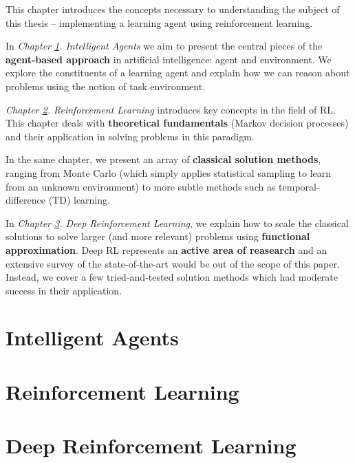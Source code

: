 This chapter introduces the concepts necessary to understanding the subject of this thesis -- implementing a learning agent using reinforcement learning.

In \emph{Chapter \ref{agents-intro}. Intelligent Agents} we aim to present the central pieces of the \textbf{agent-based approach} in artificial intelligence: agent and environment.
We explore the constituents of a learning agent and explain how we can reason about problems using the notion of task environment.

\emph{Chapter \ref{reinforcement-learning}. Reinforcement Learning} introduces key concepts in the field of RL. This chapter deals with \textbf{theoretical fundamentals} (Markov decision processes) and their application in solving problems in this paradigm.

In the same chapter, we present an array of \textbf{classical solution methods}, ranging from Monte Carlo (which simply applies statistical sampling to learn from an unknown environment) to more subtle methods such as temporal-difference (TD) learning.

In \emph{Chapter \ref{deep-rl}. Deep Reinforcement Learning}, we explain how to scale the classical solutions to solve larger (and more relevant) problems using \textbf{functional approximation}.
Deep RL represents an \textbf{active area of reasearch} and an extensive survey of the state-of-the-art would be out of the scope of this paper.
Instead, we cover a few tried-and-tested solution methods which had moderate success in their application.

\clearpage

\section{Intelligent Agents} \label{agents-intro}


\section{Reinforcement Learning} \label{reinforcement-learning}


\section{Deep Reinforcement Learning} \label{deep-rl}
